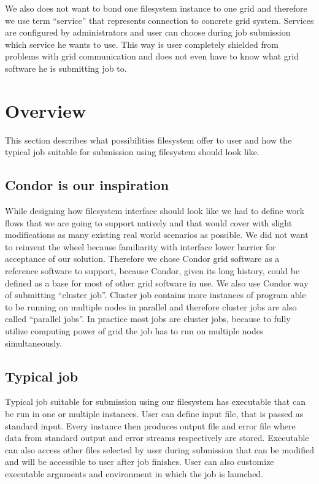\documentclass[a4paper,10pt,twocolumn]{article}
\newcommand{\term}[1]{``#1''}
\begin{document}
We also does not want to bond one filesystem instance to one grid and therefore we use term \term{service} that represents connection to concrete grid system. Services are configured by administrators and user can choose during job submission which service he wants to use. This way is user completely shielded from problems with grid communication and does not even have to know what grid software he is submitting job to.



\section{Overview}

This section describes what possibilities filesystem offer to user and how the typical job suitable for submission using filesystem should look like.

\subsection{Condor is our inspiration}
While designing how filesystem interface should look like we had to define work flows that we are going to support natively and that would cover with slight modifications as many existing real world scenarios as possible. We did not want to reinvent the wheel because familiarity with interface lower barrier for acceptance of our solution. Therefore we chose Condor\cite{condor} grid software as a reference software to support, because Condor, given its long history, could be defined as a base for most of other grid software in use. We also use Condor way of submitting \term{cluster job}. Cluster job contains more instances of program able to be running on multiple nodes in parallel and therefore cluster jobs are also called \term{parallel jobs}. In practice most jobs are cluster jobs, because to fully utilize computing power of grid the job has to run on multiple nodes simultaneously.

\subsection{Typical job}
Typical job suitable for submission using our filesystem has executable that can be run in one or multiple instances. User can define input file, that is passed as standard input. Every instance then produces output file and error file where data from standard output and error streams respectively are stored. Executable can also access other files selected by user during submission that can be modified and will be accessible to user after job finishes. User can also customize executable arguments and environment in which the job is launched.
\end{document}

